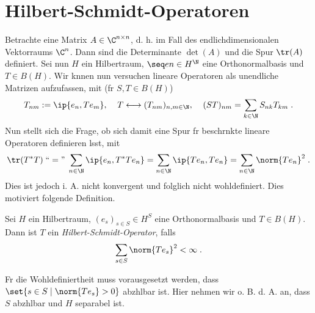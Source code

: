\section{Hilbert-Schmidt-Operatoren}

\begin{rem}[Motivation]
	Betrachte eine Matrix \(A\in \C^{n\times n}\), d. h. im Fall des endlichdimensionalen Vektorraums \(\C^n\). Dann sind die Determinante \(\det(A)\) und die Spur \(\tr(A)\) definiert. Sei nun \(H\) ein Hilbertraum, \(\seq en \in H^\N\) eine Orthonormalbasis und \(T\in B(H)\). Wir k\os nnen nun versuchen lineare Operatoren als unendliche Matrizen aufzufassen, mit (f\us r \(S,T\in B(H)\))
	\[T_{nm} := \ip{e_n, Te_m},\;\;\;\; T \longleftrightarrow (T_{nm})_{n,m\in\N},\;\;\;\; (ST)_{nm} = \sum_{k\in\N} S_{nk}T_{km}\;.\]
	Nun stellt sich die Frage, ob sich damit eine Spur f\us r beschr\as nkte lineare Operatoren definieren l\as sst, mit 
	\[\tr(T^*T) \;``= "\; \sum_{n\in\N} \ip{e_n, T^*T e_n} = \sum_{n\in\N}\ip{T e_n, T e_n} = \sum_{n\in\N} \norm{T e_n}^2\;. \]
	Dies ist jedoch i. A. nicht konvergent und folglich nicht wohldefiniert. Dies motiviert folgende Definition.
\end{rem}

\begin{definition}
	Sei \(H\) ein Hilbertraum, \((e_s)_{s\in S}\in H^S\) eine Orthonormalbasis und \(T\in B(H)\). Dann ist \(T\) ein \textit{Hilbert-Schmidt-Operator}, falls 
	\[\sum_{s\in S} \norm{T e_s}^2 < \infty\;.\] 
\end{definition}
\begin{rem}
	F\us r die Wohldefiniertheit muss vorausgesetzt werden, dass \(\set{s\in S \;\vert\; \norm{Te_s} > 0}\) abz\as hlbar ist. Hier nehmen wir o. B. d. A. an, dass $S$ abz\as hlbar und $H$ separabel ist. 
\end{rem}

